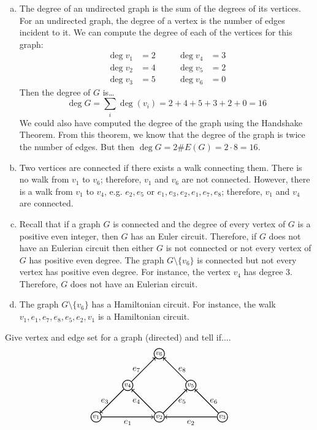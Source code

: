 \documentclass[11pt,letterpaper]{article}
\begin{document}
\begin{enumerate}[(a)]
\item The degree of an undirected graph is the sum of the degrees of its vertices. For an undirected graph, the degree of a vertex is the number of edges incident to it. We can compute the degree of each of the vertices for this graph:
	\[
	\begin{aligned}
	\deg v_1&= 2 \quad& & \deg v_4&= 3 \\
	\deg v_2&= 4 & & \deg v_5&= 2 \\
	\deg v_3&= 5 & & \deg v_6&= 0
	\end{aligned}
	\]
Then the degree of $G$ is\dots
	\[
	\deg G= \sum_i \deg(v_i)= 2 + 4 + 5 + 3 + 2 + 0= 16
	\]
We could also have computed the degree of the graph using the Handshake Theorem. From this theorem, we know that the degree of the graph is twice the number of edges. But then $\deg G= 2 \#E(G)= 2 \cdot 8= 16$. 

\item Two vertices are connected if there exists a walk connecting them. There is no walk from $v_1$ to $v_6$; therefore, $v_1$ and $v_6$ are not connected. However, there is a walk from $v_1$ to $v_4$, e.g. $e_2, e_5$ or $e_1, e_3, e_2, e_1, e_7, e_8$; therefore, $v_1$ and $v_4$ are connected. 

\item Recall that if a graph $G$ is connected and the degree of every vertex of $G$ is a positive even integer, then $G$ has an Euler circuit. Therefore, if $G$ does not have an Eulerian circuit then either $G$ is not connected or not every vertex of $G$ has positive even degree.  The graph $G \setminus \{ v_6 \}$ is connected but not every vertex has positive even degree. For instance, the vertex $v_4$ has degree 3. Therefore, $G$ does not have an Eulerian circuit. 

\item The graph $G \setminus \{ v_6 \}$ has a Hamiltonian circuit. For instance, the walk $v_1, e_1, e_7, e_8, e_5, e_2, v_1$ is a Hamiltonian circuit. 
\end{enumerate}



\newpage



 Give vertex and edge set for a graph (directed) and tell if....
	\[
	\graphTwo
	\]
\end{document}
